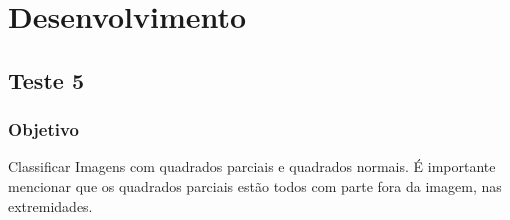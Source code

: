 

\chapter{Desenvolvimento}
\label{ch:desenvolvimento}

\section{Teste 5}

\subsection{Objetivo}
Classificar Imagens com quadrados parciais e quadrados normais. É importante mencionar que os quadrados parciais estão todos com parte fora da imagem, nas extremidades. 

